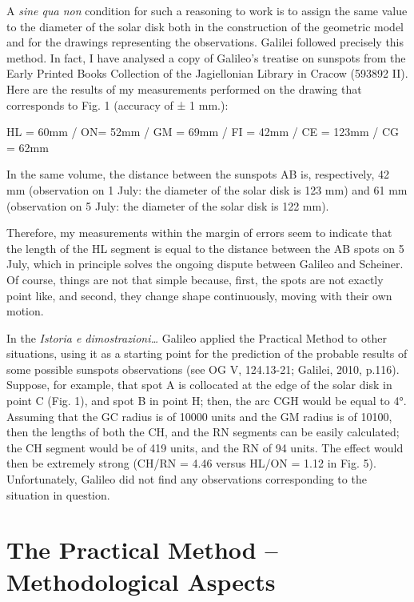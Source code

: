 \begin{artengenv}
A \textit{sine qua non} condition for such a reasoning to work is to assign the same value to the diameter of the solar
disk both in the construction of the geometric model and for the drawings representing the observations. Galilei
followed precisely this method. In fact, I have analysed a copy of Galileo’s treatise on sunspots from the Early
Printed Books Collection of the Jagiellonian Library in Cracow (593892 II). Here are the results of my measurements
performed on the drawing that corresponds to Fig. 1 (accuracy of ± 1 mm.):

{\centering
HL = 60mm / ON= 52mm / GM = 69mm / FI = 42mm / CE = 123mm / CG = 62mm
\par}

In the same volume, the distance between the sunspots AB is, respectively, 42 mm (observation on 1 July: the diameter of
the solar disk is 123 mm) and 61 mm (observation on 5 July: the diameter of the solar disk is 122 mm).

Therefore, my measurements within the margin of errors seem to indicate that the length of the HL segment is equal to
the distance between the AB spots on 5 July, which in principle solves the ongoing dispute between Galileo and
Scheiner. Of course, things are not that simple because, first, the spots are not exactly point like, and second, they
change shape continuously, moving with their own motion.

In the \textit{Istoria e dimostrazioni…} Galileo applied the Practical Method to other situations, using it as a
starting point for the prediction of the probable results of some possible sunspots observations
\label{ref:RNDXFf9yDVuZC}(see OG V, 124.13-21; Galilei, 2010, p.116). Suppose, for example, that spot A is collocated
at the edge of the solar disk in point C (Fig. 1), and spot B in point H; then, the arc CGH would be equal to 4°.
Assuming that the GC radius is of 10000 units and the GM radius is of 10100, then the lengths of both the CH, and the
RN segments can be easily calculated; the CH segment would be of 419 units, and the RN of 94 units. The effect would
then be extremely strong (CH/RN = 4.46 versus HL/ON = 1.12 in Fig. 5). Unfortunately, Galileo did not find any
observations corresponding to the situation in question.

\section{The Practical Method -- Methodological Aspects}


\end{artengenv}
